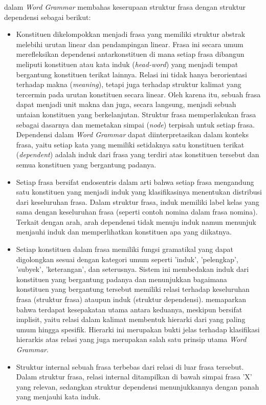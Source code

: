 \cite{hudson2010introduction} dalam \textit{Word Grammar} membahas keserupaan struktur frasa dengan struktur dependensi sebagai berikut:
\begin{itemize}
\item Konstituen dikelompokkan menjadi frasa yang memiliki struktur abstrak melebihi urutan linear dan pendampingan linear. Frasa ini secara umum merefleksikan dependensi antarkonstituen di mana setiap frasa dibangun meliputi konstituen atau kata induk (\textit{head-word}) yang menjadi tempat bergantung konstituen terikat lainnya. Relasi ini tidak hanya berorientasi terhadap makna (\textit{meaning}), tetapi juga terhadap struktur kalimat yang tercermin pada urutan konstituen secara linear. Oleh karena itu, sebuah frasa dapat menjadi unit makna dan juga, secara langsung, menjadi sebuah untaian konstituen yang berkelanjutan. Struktur frasa memperlakukan frasa sebagai dasarnya dan memetakan \gls{simpai} (\textit{node}) terpisah untuk setiap frasa. Dependensi dalam \textit{Word Grammar} dapat diinterpretasikan dalam konteks frasa, yaitu setiap kata yang memiliki setidaknya satu konstituen terikat (\textit{dependent}) adalah induk dari frasa yang terdiri atas konstituen tersebut dan semua konstituen yang bergantung padanya.
\item Setiap frasa bersifat endosentris dalam arti bahwa setiap frasa mengandung satu konstituen yang menjadi induk yang klasifikasinya menentukan distribusi dari keseluruhan frasa. Dalam struktur frasa, induk memiliki label kelas yang sama dengan keseluruhan frasa (seperti contoh nomina dalam frasa nomina). Terkait dengan arah, arah dependensi tidak menuju induk namun menunjuk menjauhi induk dan memperlihatkan konstituen apa yang diikatnya.
\item Setiap konstituen dalam frasa memiliki fungsi gramatikal yang dapat digolongkan sesuai dengan kategori umum seperti 'induk', 'pelengkap', 'subyek', 'keterangan', dan seterusnya. Sistem ini membedakan induk dari konstituen yang bergantung padanya dan menunjukkan bagaimana konstituen yang bergantung tersebut memiliki relasi terhadap keseluruhan frasa (struktur frasa) ataupun induk (struktur dependensi). \cite{hudson2007language} memaparkan bahwa terdapat kesepakatan utama antara keduanya, meskipun bersifat implisit, yaitu relasi dalam kalimat membentuk hierarki dari yang paling umum hingga spesifik. Hierarki ini merupakan bukti jelas terhadap klasifikasi hierarkis atas relasi yang juga merupakan salah satu prinsip utama \textit{Word Grammar}.
\item Struktur internal sebuah frasa terbebas dari relasi di luar frasa tersebut. Dalam struktur frasa, relasi internal ditampilkan di bawah simpai frasa 'X' yang relevan, sedangkan struktur dependensi menunjukkannya dengan panah yang menjauhi kata induk.

\end{itemize}
